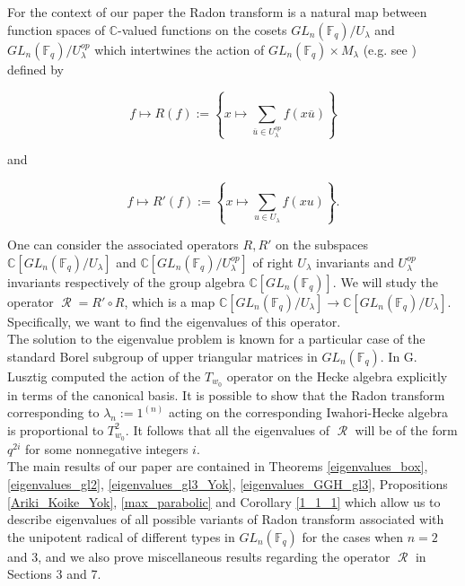 \documentclass[12pt,reqno]{amsart}
\theoremstyle{definition}
\theoremstyle{remark}
\numberwithin{equation}{section}
\newcommand{\CC}{\mathbb{C}}
\newcommand{\GL}[1]{GL_{#1}(\mathbb{F}_q)}
\DeclareMathOperator{\R}{\mathcal{R}}
\begin{document}
For the context of our paper the Radon transform is a natural map between function spaces of $\CC$-valued functions on the cosets $\GL{n} / U_\lambda$ and $\GL{n} / U_\lambda^{op}$ which intertwines the action of $\GL{n} \times M_\lambda$ (e.g. see \cite{S}) defined by

\begin{equation*}
    f \mapsto R(f) := \left \{ x \mapsto \sum_{\overline{u}\in U_\lambda^{op}} f(x \overline{u}) \right \}
\end{equation*}

and

\begin{equation*}
    f \mapsto R'(f) := \left \{ x \mapsto \sum_{u \in U_\lambda} f(xu) \right \}.
\end{equation*}

One can consider the associated operators $R,R'$ on the subspaces $\CC [ \GL{n} / U_\lambda]$ and $\CC [ \GL{n} / U_\lambda^{op} ]$ of right $U_\lambda$ invariants and $U_\lambda^{op}$ invariants respectively of the group algebra $\CC[\GL{n}]$. %
We will study the operator $\R=R'\circ R$, which is a map $\CC [ \GL{n} / U_\lambda] \to \CC [ \GL{n} / U_\lambda ]$. Specifically, we want to find the eigenvalues of this operator.\\


The solution to the eigenvalue problem is known for a particular case of the standard Borel subgroup of upper triangular matrices in $\GL{n}$. In \cite{L} G. Lusztig computed the action of the $T_{w_0}$ operator on the Hecke algebra explicitly in terms of the canonical basis. It is possible to show that the Radon transform corresponding to $\lambda_n:=1^{(n)}$ acting on the corresponding Iwahori-Hecke algebra is proportional to $T_{w_0}^2$. It follows that all the eigenvalues of $\R$ will be of the form $q^{2i}$ for some nonnegative integers $i$.\\


The main results of our paper are contained in Theorems \ref{eigenvalues_box}, \ref{eigenvalues_gl2}, \ref{eigenvalues_gl3_Yok}, \ref{eigenvalues_GGH_gl3}, Propositions \ref{Ariki_Koike_Yok}, \ref{max_parabolic} and Corollary \ref{1_1_1} which allow us to describe eigenvalues of all possible variants of Radon transform associated with the unipotent radical of different types in $\GL{n}$ for the cases when $n=2$ and $3$, and we also prove miscellaneous results regarding the operator $\R$ in Sections 3 and 7.\\
\end{document}
